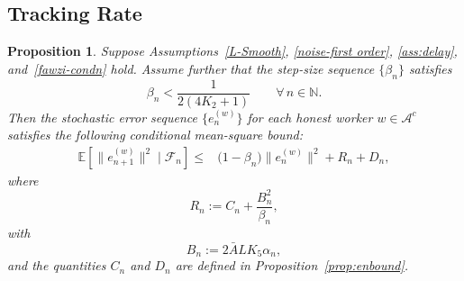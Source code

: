 \documentclass{article}
\newtheorem{proposition}[theorem]{Proposition}
\begin{document}
\subsection{Tracking Rate}
\begin{proposition}
\label{propoenbound 1}
Suppose Assumptions~\ref{L-Smooth}, \ref{noise-first order},
\ref{ass:delay}, and~\ref{fawzi-condn} hold. Assume further that the step-size sequence $\{\beta_n\}$ satisfies
\[
\beta_n
<
\frac{1}{2(4K_2+1)}
\qquad
\forall\, n \in \mathbb{N}.
\]
Then the stochastic error sequence $\{e_n^{(w)}\}$ for each honest worker $w \in \mathcal{A}^c$ satisfies the following conditional mean-square bound:
\begin{equation}
\begin{split}
\mathbb{E}\!\left[
\|e_{n+1}^{(w)}\|^2
\mid
\mathcal{F}_n
\right]
\le{}&
\big(1-\beta_n\big)
\|e_n^{(w)}\|^2
+
R_n
+
D_n ,
\end{split}
\label{18eq1}
\end{equation}
where
\[
R_n
:=
C_n
+
\frac{B_n^2}{\beta_n},
\]
with
\[
B_n
:=
2\bar{A} L K_5 \alpha_n,
\]
and the quantities $C_n$ and $D_n$ are defined in Proposition~\ref{prop:enbound}.
\end{proposition}
\end{document}
